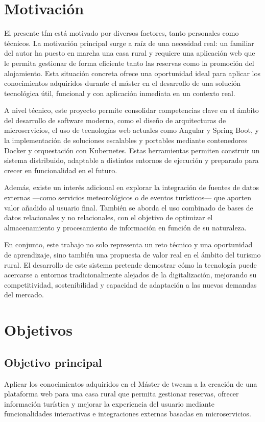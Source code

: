 \section*{Motivación}
El presente \gls{tfm} está motivado por diversos factores, tanto personales como técnicos. La motivación principal surge a raíz de una necesidad real: un familiar del autor ha puesto en marcha una casa rural y requiere una aplicación web que le permita gestionar de forma eficiente tanto las reservas como la promoción del alojamiento. Esta situación concreta ofrece una oportunidad ideal para aplicar los conocimientos adquiridos durante el máster en el desarrollo de una solución tecnológica útil, funcional y con aplicación inmediata en un contexto real.

A nivel técnico, este proyecto permite consolidar competencias clave en el ámbito del desarrollo de software moderno, como el diseño de arquitecturas de microservicios, el uso de tecnologías web actuales como Angular y Spring Boot, y la implementación de soluciones escalables y portables mediante contenedores Docker y orquestación con Kubernetes. Estas herramientas permiten construir un sistema distribuido, adaptable a distintos entornos de ejecución y preparado para crecer en funcionalidad en el futuro.

Además, existe un interés adicional en explorar la integración de fuentes de datos externas —como servicios meteorológicos o de eventos turísticos— que aporten valor añadido al usuario final. También se aborda el uso combinado de bases de datos relacionales y no relacionales, con el objetivo de optimizar el almacenamiento y procesamiento de información en función de su naturaleza.

En conjunto, este trabajo no solo representa un reto técnico y una oportunidad de aprendizaje, sino también una propuesta de valor real en el ámbito del turismo rural. El desarrollo de este sistema pretende demostrar cómo la tecnología puede acercarse a entornos tradicionalmente alejados de la digitalización, mejorando su competitividad, sostenibilidad y capacidad de adaptación a las nuevas demandas del mercado.

\section{Objetivos}
\subsection{Objetivo principal}
Aplicar los conocimientos adquiridos en el Máster de \gls{twcam} a la creación de una plataforma web para una casa rural que permita gestionar reservas, ofrecer información turística y mejorar la experiencia del usuario mediante funcionalidades interactivas e integraciones externas basadas en microservicios.

